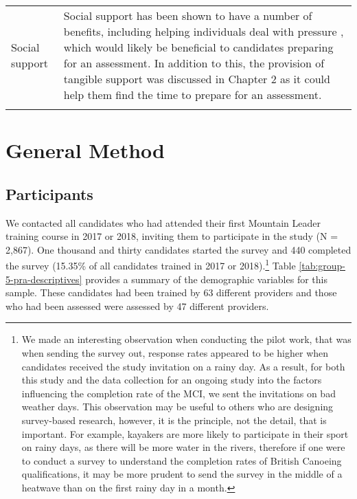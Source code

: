 \documentclass[
  12pt,
  a4paper,
]{book}
\begin{document}
\begin{landscape}
\begin{longtable}[t]{>{\raggedright\arraybackslash}p{3cm}>{\raggedright\arraybackslash}p{21cm}}
Social support & Social support has been shown to have a number of benefits, including helping individuals deal with pressure \citep{Freeman2011, Freeman2014}, which would likely be beneficial to candidates preparing for an assessment. In addition to this, the provision of tangible support was discussed in Chapter 2 as it could help them find the time to prepare for an assessment.\\*
\end{longtable}
\end{landscape}

\hypertarget{pra-general-method}{%
\section{General Method}\label{pra-general-method}}

\hypertarget{pra-participants}{%
\subsection{Participants}\label{pra-participants}}

We contacted all candidates who had attended their first Mountain Leader training course in 2017 or 2018, inviting them to participate in the study (N = 2,867). One thousand and thirty candidates started the survey and 440 completed the survey (15.35\% of all candidates trained in 2017 or 2018).\footnote{We made an interesting observation when conducting the pilot work, that was when sending the survey out, response rates appeared to be higher when candidates received the study invitation on a rainy day. As a result, for both this study and the data collection for an ongoing study into the factors influencing the completion rate of the MCI, we sent the invitations on bad weather days. This observation may be useful to others who are designing survey-based research, however, it is the principle, not the detail, that is important. For example, kayakers are more likely to participate in their sport on rainy days, as there will be more water in the rivers, therefore if one were to conduct a survey to understand the completion rates of British Canoeing qualifications, it may be more prudent to send the survey in the middle of a heatwave than on the first rainy day in a month.} Table \ref{tab:group-5-pra-descriptives} provides a summary of the demographic variables for this sample. These candidates had been trained by 63 different providers and those who had been assessed were assessed by 47 different providers.
\end{document}
